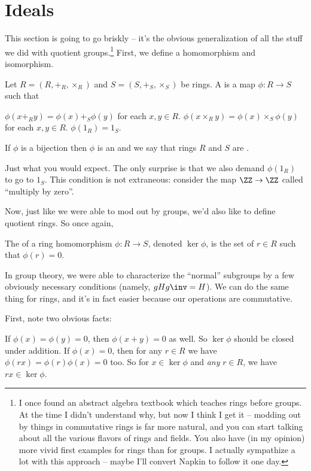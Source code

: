 \section{Ideals}
This section is going to go briskly --
it's the obvious generalization of all the stuff we did with quotient groups.\footnote{%
	I once found an abstract algebra textbook which teaches rings
	before groups.  At the time I didn't understand why,
	but now I think I get it -- modding out by things in
	commutative rings is far more natural, and you can start talking
	about all the various flavors of rings and fields.
	You also have (in my opinion) more vivid first examples
	for rings than for groups.
	I actually sympathize a lot with this approach -- maybe I'll convert
	Napkin to follow it one day.}
First, we define a homomorphism and isomorphism.

\begin{definition}
	Let $R = (R, +_R, \times_R)$ and $S = (S, +_S, \times_S)$ be rings.
	A  is a map $\phi : R \to S$
	such that 
	\begin{enumerate}[(i)]
		\ii $\phi(x +_R y) = \phi(x) +_S \phi(y)$ for each $x,y \in R$.
		\ii $\phi(x \times_R y) = \phi(x) \times_S \phi(y)$ for each $x,y \in R$.
		\ii $\phi(1_R) = 1_S$.
	\end{enumerate}
	If $\phi$ is a bijection then $\phi$ is an 
	and we say that rings $R$ and $S$ are .
\end{definition}
Just what you would expect.
The only surprise is that we also demand $\phi(1_R)$ to go to $1_S$.
This condition is not extraneous:
consider the map $\ZZ \to \ZZ$ called ``multiply by zero''.

Now, just like we were able to mod out by groups, we'd also like to define quotient rings.
So once again,
\begin{definition}
	The  of a ring homomorphism $\phi : R \to S$,
	denoted $\ker \phi$, is the set of $r \in R$ such that $\phi(r) = 0$.
\end{definition}

In group theory, we were able to characterize the ``normal'' subgroups by a few
obviously necessary conditions (namely, $gHg\inv = H$).
We can do the same thing for rings, and it's in fact easier because our operations are commutative.

First, note two obvious facts:
\begin{itemize}
	\ii If $\phi(x) = \phi(y) = 0$, then $\phi(x+y) = 0$ as well.
	So $\ker \phi$ should be closed under addition.
	\ii If $\phi(x) = 0$, then for any $r \in R$ we have
	$\phi(rx) = \phi(r)\phi(x) = 0$ too.
	So for $x \in \ker \phi$ and \emph{any} $r \in R$,
	we have $rx \in \ker\phi$.
\end{itemize}

